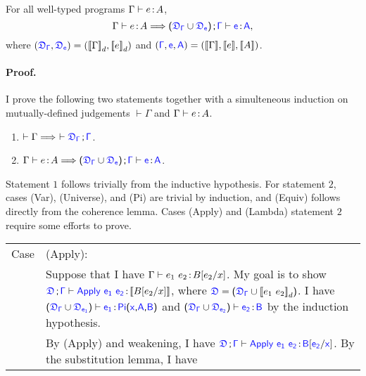 \begin{theorem} For all well-typed programs $\Gamma \vdash {e} \hspace{0.5mm}{:}\hspace{0.5mm} {A}$,
\begin{equation*}
	{\Gamma} \vdash {e} \goodcolon {A} \Longrightarrow 
	\sfpl \target{\fdef_{\Gamma}} \cup \target{\fdef_{e}} \sfpr \semicolon \target{\Gamma} \vdash \target{e} \goodcolon \target{A},
\end{equation*}
where $(\target{\fdef_{\Gamma}}, \target{\fdef_{e}}) 
= (\bbracket{{\Gamma}}_d, \bbracket{{e}}_d)$ and 
$(\target{\Gamma}, \target{{e}}, \target{{A}}) 
= (\bbracket{{\Gamma}}, \bbracket{{e}}, \bbracket{{A}})$.
\paragraph{Proof.} I prove the following two statements together with a simulteneous induction on mutually-defined judgements $\vdash {\Gamma}$ and ${\Gamma} \vdash {e} \hspace{0.5mm}{:}\hspace{0.5mm} {A}$.
\begin{enumerate}
	\item $\vdash {\Gamma} \Longrightarrow\  \vdash \target{\fdef_{\Gamma}} \semicolon \target{\Gamma}$.
	\item ${\Gamma} \vdash {e} \goodcolon {A} \Longrightarrow 
		\sfpl \target{\fdef_{\Gamma}} \cup \target{\fdef_{e}} \sfpr \semicolon \target{\Gamma} \vdash \target{e} \goodcolon \target{A}$.
\end{enumerate}
Statement $1$ follows trivially from the inductive hypothesis. For statement $2$, cases (Var), (Universe), and (Pi) are trivial by induction, and (Equiv) follows directly from the coherence lemma. Cases (Apply) and (Lambda) statement $2$ require some efforts to prove.
\begin{longtable}{p{0.05\linewidth} p{0.95\linewidth}}
Case & (Apply): \\
& Suppose that I have $\Gamma \vdash e_1\ e_2 \hspace{0.5mm}{:}\hspace{0.5mm} B[e_2\slash x]$. My goal is to show $\targetcon \vdash \targetapp{e_1}{e_2} \goodcolon \bbracket{B\sub{e_2}{x}}$, where 
$\target{\fdef} = \sfpl \target{\fdef_{\Gamma}} \cup \bbracket{e_1\ e_2}_d \sfpr$. I have
$\sfpl \target{\fdef_{\Gamma}} \cup \target{\fdef_{e_1}} \sfpr \vdash
\target{e_1} \goodcolon \targetpi{x}{A}{B}$ and
$\sfpl \target{\fdef_{\Gamma}} \cup \target{\fdef_{e_2}} \sfpr \vdash
\target{e_2} \goodcolon \target{B}$ by the induction hypothesis. \\
& By (Apply) and weakening, I have
$\targetcon \vdash \targetapp{e_1}{e_2} \goodcolon \target{B}\targetsub{e_2}{x}$. By the substitution lemma, I have

\end{longtable}
\end{theorem}
